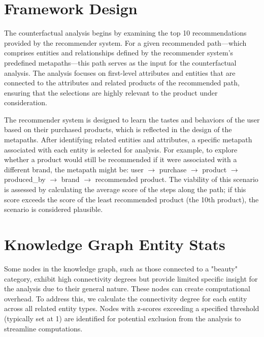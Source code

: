 \section{Framework Design}

The counterfactual analysis begins by examining the top 10 recommendations provided by the recommender system. For a given recommended path—which comprises entities and relationships defined by the recommender system's predefined metapaths—this path serves as the input for the counterfactual analysis. The analysis focuses on first-level attributes and entities that are connected to the attributes and related products of the recommended path, ensuring that the selections are highly relevant to the product under consideration.

The recommender system is designed to learn the tastes and behaviors of the user based on their purchased products, which is reflected in the design of the metapaths. After identifying related entities and attributes, a specific metapath associated with each entity is selected for analysis. For example, to explore whether a product would still be recommended if it were associated with a different brand, the metapath might be: user \(\rightarrow\) purchase \(\rightarrow\) product \(\rightarrow\) produced\_by \(\rightarrow\) brand \(\rightarrow\) recommended product. The viability of this scenario is assessed by calculating the average score of the steps along the path; if this score exceeds the score of the least recommended product (the 10th product), the scenario is considered plausible.



\section{Knowledge Graph Entity Stats}
Some nodes in the knowledge graph, such as those connected to a "beauty" category, exhibit high connectivity degrees but provide limited specific insight for the analysis due to their general nature. These nodes can create computational overhead. To address this, we calculate the connectivity degree for each entity across all related entity types. Nodes with z-scores exceeding a specified threshold (typically set at 1) are identified for potential exclusion from the analysis to streamline computations.

